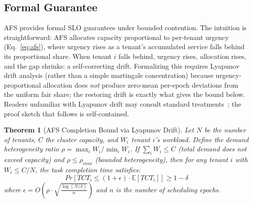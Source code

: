 \documentclass[sigconf]{acmart}
\newtheorem{theorem}{Theorem}
\begin{document}
\subsection{Formal Guarantee}
\label{sec:slo}

AFS provides formal SLO guarantees under bounded contention. The intuition is straightforward: AFS allocates capacity proportional to per-tenant urgency (Eq.~\ref{eq:afs}), where urgency rises as a tenant's accumulated service falls behind its proportional share. When tenant $i$ falls behind, urgency rises, allocation rises, and the gap shrinks: a self-correcting drift. Formalizing this requires Lyapunov drift analysis (rather than a simple martingale concentration) because urgency-proportional allocation does \emph{not} produce zero-mean per-epoch deviations from the uniform fair share; the restoring drift is exactly what gives the bound below. Readers unfamiliar with Lyapunov drift may consult standard treatments~\cite{dubhashi2009concentration}; the proof sketch that follows is self-contained.

\begin{theorem}[AFS Completion Bound via Lyapunov Drift]
\label{thm:afs}
Let $N$ be the number of tenants, $C$ the cluster capacity, and $W_i$ tenant $i$'s workload. Define the demand heterogeneity ratio $\rho = \max_i W_i / \min_i W_i$. If $\sum_i W_i \leq C$ (total demand does not exceed capacity) and $\rho \leq \rho_{max}$ (bounded heterogeneity), then for any tenant $i$ with $W_i \leq C/N$, the task completion time satisfies:
\begin{equation}
    Pr\left[TCT_i \leq (1 + \epsilon) \cdot \mathbb{E}[TCT_i]\right] \geq 1 - \delta
    \label{eq:slo}
\end{equation}
where $\epsilon = O\left(\rho \cdot \sqrt{\frac{\log(N/\delta)}{n}}\right)$ and $n$ is the number of scheduling epochs.
\end{theorem}
\end{document}

